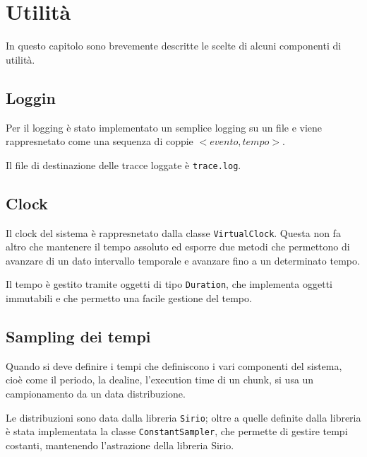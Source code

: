 \section{Utilità}
In questo capitolo sono brevemente descritte le scelte di alcuni componenti di utilità.

\subsection{Loggin}
Per il logging è stato implementato un semplice logging su un file e viene rappresnetato come una sequenza di coppie $<evento,tempo>$.

Il file di destinazione delle tracce loggate è \texttt{trace.log}.

\subsection{Clock}
Il clock del sistema è rappresnetato dalla classe \texttt{VirtualClock}. Questa non fa altro che mantenere il tempo assoluto ed esporre due metodi che permettono di avanzare di un dato intervallo temporale e avanzare fino a un determinato tempo.

Il tempo è gestito tramite oggetti di tipo \texttt{Duration}, che implementa oggetti immutabili e che permetto una facile gestione del tempo.

\subsection{Sampling dei tempi}
Quando si deve definire i tempi che definiscono i vari componenti del sistema, cioè come il periodo, la dealine, l'execution time di un chunk, si usa un campionamento da un data distribuzione.

Le distribuzioni sono data dalla libreria \texttt{Sirio}; oltre a quelle definite dalla libreria è stata implementata la classe \texttt{ConstantSampler}, che permette di gestire tempi costanti, mantenendo l'astrazione della libreria Sirio.